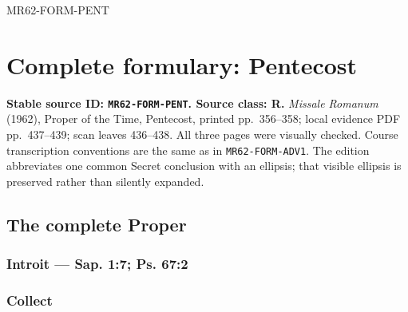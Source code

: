 \begin{reviewsourceunit}{MR62-FORM-PENT}
\chapter{Complete formulary: Pentecost}

\textbf{Stable source ID: \texttt{MR62-FORM-PENT}. Source class: R.}
\textit{Missale Romanum} (1962), Proper of the Time, Pentecost, printed
pp.~356--358; local evidence PDF pp.~437--439; scan leaves 436--438.  All three
pages were visually checked.  Course transcription conventions are the same
as in \texttt{MR62-FORM-ADV1}.  The edition abbreviates one common Secret
conclusion with an ellipsis; that visible ellipsis is preserved rather than
silently expanded.

\section{The complete Proper}

\subsection*{Introit --- Sap. 1:7; Ps. 67:2}

\subsection*{Collect}


\end{reviewsourceunit}
